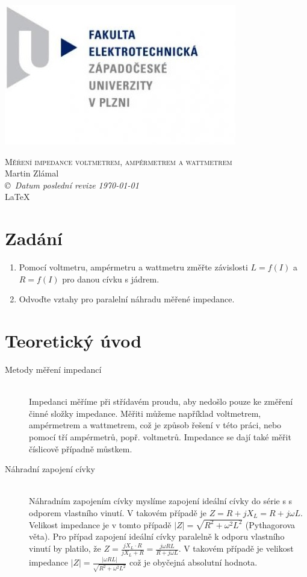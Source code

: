 \documentclass[12pt]{article} %
\newcommand{\bigsize}{\fontsize{35pt}{20pt}\selectfont}
\begin{document}
\begin{titlepage}
	\includegraphics[scale=0.7]{logo.jpg}
	\vspace*{\fill}
	\begin{center}
		\textsc{\LARGE \bigsize Měření impedance voltmetrem, ampérmetrem a wattmetrem}\\[1cm]
		Martin Zlámal \\[1cm]
		{\small\em \copyright \ Datum poslední revize \today } \\
		\LaTeX
	\end{center}
	\vspace*{\fill}
\end{titlepage}
\tableofcontents
\listoffigures
\listoftables
\newpage

\section{Zadání}
\begin{enumerate}
\item Pomocí voltmetru, ampérmetru a wattmetru změřte závislosti $L=f(I)$ a $R=f(I)$
pro danou cívku s jádrem.
\item Odvoďte vztahy pro paralelní náhradu měřené impedance.
\end{enumerate}

\section{Teoretický úvod}
\begin{description}
\item[Metody měření impedancí] \hfill \\
Impedanci měříme při střídavém proudu, aby nedošlo pouze ke změření činné složky impedance. Měřiti můžeme například voltmetrem, ampérmetrem a wattmetrem, což je způsob řešení v této práci, nebo pomocí tří ampérmetrů, popř. voltmetrů. Impedance se dají také měřit číslicově případně můstkem.
\item[Náhradní zapojení cívky] \hfill \\
Náhradním zapojením cívky myslíme zapojení ideální cívky do série s s odporem vlastního vinutí. V takovém případě je $Z=R+jX_L=R+j\omega L$. Velikost impedance je v tomto případě $|Z|=\sqrt{R^2 + \omega^2 L^2}$ (Pythagorova věta). Pro případ zapojení ideální cívky paralelně k odporu vlastního vinutí by platilo, že $Z=\frac{jX_L\cdot R}{jX_L+R}=\frac{j\omega RL}{R+j\omega L}$. V takovém případě je velikost impedance $|Z|=\frac{|\omega RL|}{\sqrt{R^2 + \omega^2 L^2}}$ což je obyčejná absolutní hodnota.
\end{description}
\end{document}
